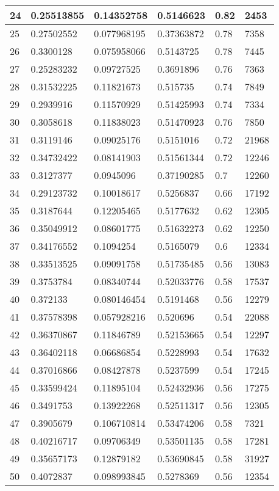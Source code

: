 \begin{longtable}{|l|l|l|l|l|l|}
24 & 0.25513855 & 0.14352758 & 0.5146623 & 0.82 & 2453 \\ \hline 
25 & 0.27502552 & 0.077968195 & 0.37363872 & 0.78 & 7358 \\ \hline 
26 & 0.3300128 & 0.075958066 & 0.5143725 & 0.78 & 7445 \\ \hline 
27 & 0.25283232 & 0.09727525 & 0.3691896 & 0.76 & 7363 \\ \hline 
28 & 0.31532225 & 0.11821673 & 0.515735 & 0.74 & 7849 \\ \hline 
29 & 0.2939916 & 0.11570929 & 0.51425993 & 0.74 & 7334 \\ \hline 
30 & 0.3058618 & 0.11838023 & 0.51470923 & 0.76 & 7850 \\ \hline 
31 & 0.3119146 & 0.09025176 & 0.5151016 & 0.72 & 21968 \\ \hline 
32 & 0.34732422 & 0.08141903 & 0.51561344 & 0.72 & 12246 \\ \hline 
33 & 0.3127377 & 0.0945096 & 0.37190285 & 0.7 & 12260 \\ \hline 
34 & 0.29123732 & 0.10018617 & 0.5256837 & 0.66 & 17192 \\ \hline 
35 & 0.3187644 & 0.12205465 & 0.5177632 & 0.62 & 12305 \\ \hline 
36 & 0.35049912 & 0.08601775 & 0.51632273 & 0.62 & 12250 \\ \hline 
37 & 0.34176552 & 0.1094254 & 0.5165079 & 0.6 & 12334 \\ \hline 
38 & 0.33513525 & 0.09091758 & 0.51735485 & 0.56 & 13083 \\ \hline 
39 & 0.3753784 & 0.08340744 & 0.52033776 & 0.58 & 17537 \\ \hline 
40 & 0.372133 & 0.080146454 & 0.5191468 & 0.56 & 12279 \\ \hline 
41 & 0.37578398 & 0.057928216 & 0.520696 & 0.54 & 22088 \\ \hline 
42 & 0.36370867 & 0.11846789 & 0.52153665 & 0.54 & 12297 \\ \hline 
43 & 0.36402118 & 0.06686854 & 0.5228993 & 0.54 & 17632 \\ \hline 
44 & 0.37016866 & 0.08427878 & 0.5237599 & 0.54 & 17245 \\ \hline 
45 & 0.33599424 & 0.11895104 & 0.52432936 & 0.56 & 17275 \\ \hline 
46 & 0.3491753 & 0.13922268 & 0.52511317 & 0.56 & 12305 \\ \hline 
47 & 0.3905679 & 0.106710814 & 0.53474206 & 0.58 & 7321 \\ \hline 
48 & 0.40216717 & 0.09706349 & 0.53501135 & 0.58 & 17281 \\ \hline 
49 & 0.35657173 & 0.12879182 & 0.53690845 & 0.58 & 31927 \\ \hline 
50 & 0.4072837 & 0.098993845 & 0.5278369 & 0.56 & 12354 \\ \hline 
\end{longtable}